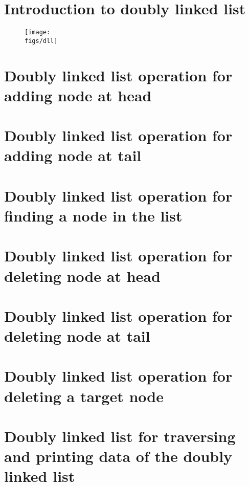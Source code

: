 \section{Introduction to doubly linked list}
\begin{figure}[H]
    \centering
    \texttt{[image: \\figs/dll]} 
\end{figure}


\section{Doubly linked list operation for adding node at head}


\section{Doubly linked list operation for adding node at tail}


\section{Doubly linked list operation for finding a node in the list}


\section{Doubly linked list operation for deleting node at head}


\section{Doubly linked list operation for deleting node at tail}


\section{Doubly linked list operation for deleting a target node}


\section{Doubly linked list for traversing and printing data of the doubly linked list}


